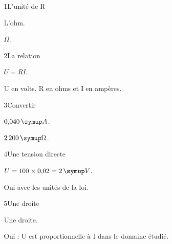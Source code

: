 \par\noindent\begin{minipage}{\linewidth}
\begin{corrige}{1}{L’unité de R}
\begin{questions}
\item L’ohm.
\item $\Omega$.
\end{questions}
\end{corrige}
\end{minipage}
\par\noindent\begin{minipage}{\linewidth}
\begin{corrige}{2}{La relation}
\begin{questions}
\item $U=RI$.
\item U en volts, R en ohms et I en ampères.
\end{questions}
\end{corrige}
\end{minipage}
\par\noindent\begin{minipage}{\linewidth}
\begin{corrige}{3}{Convertir}
\begin{questions}
\item $0{,}040\unite A$.
\item $2\,200\unite\Omega$.
\end{questions}
\end{corrige}
\end{minipage}
\par\noindent\begin{minipage}{\linewidth}
\begin{corrige}{4}{Une tension directe}
\begin{questions}
\item $U=100\times0{,}02=2\unite V$.
\item Oui avec les unités de la loi.
\end{questions}
\end{corrige}
\end{minipage}
\par\noindent\begin{minipage}{\linewidth}
\begin{corrige}{5}{Une droite}
\begin{questions}
\item Une droite.
\item Oui : U est proportionnelle à I dans le domaine étudié.
\end{questions}
\end{corrige}
\end{minipage}
